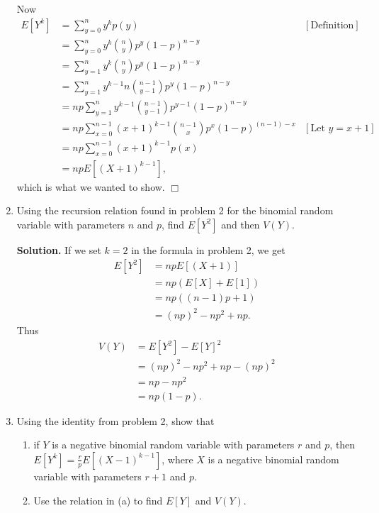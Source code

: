 \documentclass[9pt]{article}
\newcommand{\qed}{\hfill \ensuremath{\Box}}
\begin{document}
\begin{enumerate}
      Now
      \begin{align*}
         E[Y^k] &= \sum_{y=0}^ny^kp(y) &[\text{Definition}] \\
                &= \sum_{y=0}^ny^k\binom{n}{y}p^y(1 - p)^{n - y} \\
                &= \sum_{y=1}^ny^k\binom{n}{y}p^y(1 - p)^{n - y} \\
                &= \sum_{y=1}^ny^{k-1}n\binom{n - 1}{y - 1}p^y(1 - p)^{n - y} \\
                &= np\sum_{y=1}^ny^{k-1}\binom{n - 1}{y - 1}
                   p^{y-1}(1 - p)^{n - y} \\
                &= np\sum_{x=0}^{n-1}(x + 1)^{k-1}\binom{n - 1}{x}
                   p^{x}(1 - p)^{(n - 1)-x} &[\text{Let }y = x + 1] \\
                &= np\sum_{x=0}^{n-1}(x + 1)^{k-1}p(x) \\
                &= npE[(X + 1)^{k-1}],
      \end{align*}
      which is what we wanted to show. \qed
   \item Using the recursion relation found in problem 2 for the binomial random
         variable with parameters $n$ and $p$, find $E[Y^2]$ and then $V(Y)$.

      \textbf{Solution.} If we set $k = 2$ in the formula in problem 2, we get
      \begin{align*}
         E[Y^2] &= npE[(X + 1)] \\
                &= np(E[X] + E[1]) \\
                &= np((n-1)p + 1) \\
                &= (np)^2 - np^2 + np.
      \end{align*}
      Thus
      \begin{align*}
         V(Y) &= E[Y^2] - E[Y]^2 \\
              &= (np)^2 - np^2 + np - (np)^2 \\
              &= np - np^2 \\
              &= np(1 - p).
      \end{align*}
   \item Using the identity from problem 2, show that
         \begin{enumerate}
            \item if $Y$ is a negative binomial random variable with parameters
                  $r$ and $p$, then $E[Y^k] = \frac{r}{p}E[(X-1)^{k-1}]$, where
                  $X$ is a negative binomial random variable with parameters
                  $r + 1$ and $p$.
            \item Use the relation in (a) to find $E[Y]$ and $V(Y)$.
         \end{enumerate}
\end{enumerate}
\end{document}

